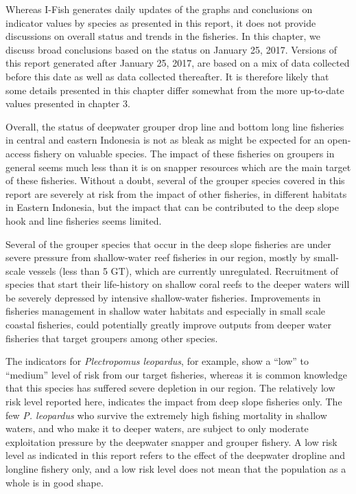 
Whereas I-Fish generates daily updates of the graphs and conclusions on indicator values by species as presented in this report, it does not provide discussions on overall status and trends in the fisheries. In this chapter, we discuss broad conclusions based on the status on January 25, 2017. Versions of this report generated after January 25, 2017, are based on a mix of data collected before this date as well as data collected thereafter. It is therefore likely that some details presented in this chapter differ somewhat from the more up-to-date values presented in chapter 3.

Overall, the status of deepwater grouper drop line and bottom long line fisheries in central and eastern Indonesia is not as bleak as might be expected for an open-access fishery on valuable species. The impact of these fisheries on groupers in general seems much less than it is on snapper resources which are the main target of these fisheries. Without a doubt, several of the grouper species covered in this report are severely at risk from the impact of other fisheries, in different habitats in Eastern Indonesia, but the impact that can be contributed to the deep slope hook and line fisheries seems limited.

Several of the grouper species that occur in the deep slope fisheries are under severe pressure from shallow-water reef fisheries in our region, mostly by small-scale vessels (less than 5 GT), which are currently unregulated. Recruitment of species that start their life-history on shallow coral reefs to the deeper waters will be severely depressed by intensive shallow-water fisheries. Improvements in fisheries management in shallow water habitats and especially in small scale coastal fisheries, could potentially greatly improve outputs from deeper water fisheries that target groupers among other species.

The indicators for \textit{Plectropomus leopardus}, for example, show a ``low'' to ``medium'' level of risk from our target fisheries, whereas it is common knowledge that this species has suffered severe depletion in our region. The relatively low risk level reported here, indicates the impact from deep slope fisheries only. The few \textit{P. leopardus} who survive the extremely high fishing mortality in shallow waters, and who make it to deeper waters, are subject to only moderate exploitation pressure by the deepwater snapper and grouper fishery. A low risk level as indicated in this report refers to the effect of the deepwater dropline and longline fishery only, and a low risk level does not mean that the population as a whole is in good shape.

